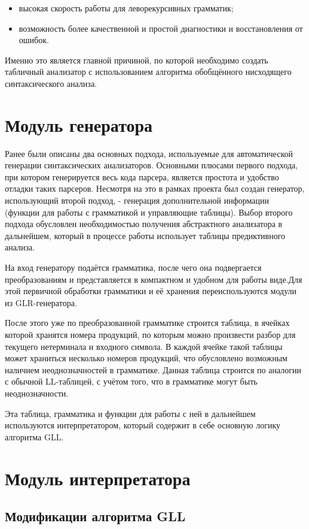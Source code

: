 \documentclass{matmex-diploma-custom}
\begin{document}
\begin{itemize}
\item высокая скорость работы для леворекурсивных грамматик;
\item возможность более качественной и простой диагностики и восстановления от ошибок.
\end{itemize}

Именно это является главной причиной, по которой необходимо создать табличный анализатор с использованием алгоритма обобщённого нисходящего синтаксического анализа.

\section{Модуль генератора}
Ранее были описаны два основных подхода, используемые для автоматической генерации синтаксических анализаторов. Основными плюсами первого подхода, при котором генерируется весь кода парсера, является простота и удобство отладки таких парсеров. Несмотря на это в рамках проекта был создан генератор, использующий второй подход, - генерация дополнительной информации (функции для работы с грамматикой и управляющие таблицы). Выбор второго подхода обусловлен необходимостью получения абстрактного анализатора в дальнейшем, который в процессе работы использует таблицы предиктивного анализа.

На вход генератору подаётся грамматика, после чего она подвергается преобразованиям и представляется в компактном и удобном для работы виде.Для этой первичной обработки грамматики и её хранения переиспользуются модули из GLR-генератора.

После этого уже по преобразованной грамматике строится таблица, в ячейках которой хранятся номера продукций, по которым можно произвести разбор для текущего нетерминала и входного символа. В каждой ячейке такой таблицы может храниться несколько номеров продукций, что обусловлено возможным наличием неоднозначностей в грамматике. Данная таблица строится по аналогии с обычной LL-таблицей, с учётом того, что в грамматике могут быть неоднозначности.

Эта таблица, грамматика и функции для работы с ней в дальнейшем используются интерпретатором, который содержит в себе основную логику алгоритма GLL.
\section{Модуль интерпретатора}
\subsection{Модификации алгоритма GLL}
\end{document}
